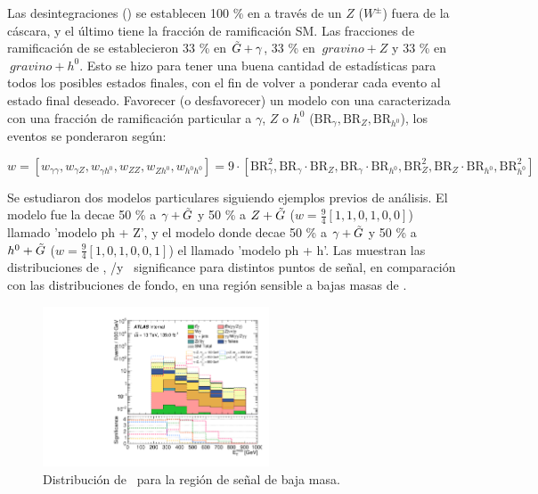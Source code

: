 Las desintegraciones \ninotwo (\chinoonepm) se establecen 100 \% en \ninoone a través de un $ Z $ ($ W ^ {\pm} $) fuera de la cáscara, y el último tiene la fracción de ramificación SM. Las fracciones de ramificación de \ninoone se establecieron 33 \% en $ \tilde{G} + \gamma$, 33 \% en $ \ gravino + Z $ y 33 \% en $ \ gravino + h^{0} $. Esto se hizo para tener una buena cantidad de estadísticas para todos los posibles estados finales, con el fin de volver a ponderar cada evento al estado final deseado. Favorecer (o desfavorecer) un modelo con una \ninoone caracterizada con una fracción de ramificación particular a $\gamma$, $ Z $ o $ h^{0} $ ($ \text{BR}_{\gamma}, \text{BR}_{Z}, \text{BR}_{h^{0}} $), los eventos se ponderaron según:


\begin{equation}
	w  = [w_{\gamma\gamma}, w_{\gamma Z}, w_{\gamma h^{0}}, w_{ZZ}, w_{Zh^{0}}, w_{h^{0}h^{0}}] = 9 \cdot [\text{BR}_{\gamma}^{2}, \text{BR}_{\gamma}\cdot\text{BR}_{Z}, \text{BR}_{\gamma}\cdot\text{BR}_{h^{0}}, \text{BR}_{Z}^{2}, \text{BR}_{Z}\cdot\text{BR}_{h^{0}}, \text{BR}_{h^{0}}^{2}]
\end{equation}

Se estudiaron dos modelos particulares siguiendo ejemplos previos de análisis. El modelo fue la \ninoone decae 50 \% a $ \gamma + \tilde{G} $ y 50 \% a $ Z + \tilde{G} $ ($ w = \frac{9}{4} [1, 1, 0, 1, 0, 0] $) llamado 'modelo ph + Z', y el modelo donde \ninoone decae 50 \% a $ \gamma + \tilde{G} $ y 50 \% a $ h^{0} + \tilde{G} $ ($ w = \frac{9}{4} [1, 0, 1, 0, 0, 1] $) el llamado 'modelo ph + h'. Las  muestran las distribuciones de \met, \met/\meff y \met\ significance para distintos puntos de señal, en comparación con las distribuciones de fondo, en una región sensible a bajas masas de \ninoone.

\begin{figure}
\centering
  \includegraphics[width=0.6\textwidth]{images_tmp/can_SRd_200_met_et_afterFit.pdf}
  \caption{Distribución de \met\ para la región de señal de baja masa.}
  \label{fig:met_srd200}
\end{figure}


